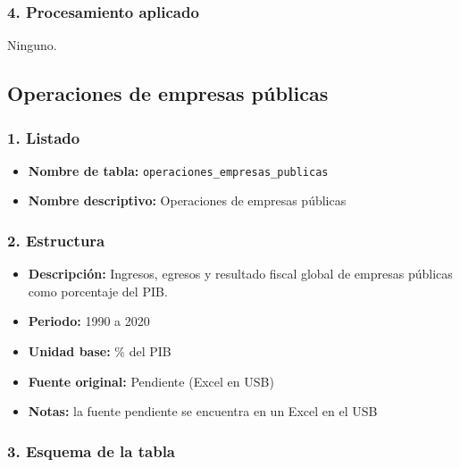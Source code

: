 \documentclass[12pt,a4paper]{article}
\begin{document}
\subsubsection*{4. Procesamiento aplicado}
Ninguno.

\subsection{Operaciones de empresas públicas}

\subsubsection*{1. Listado}
\begin{itemize}
  \item \textbf{Nombre de tabla:} \texttt{operaciones\_empresas\_publicas}
  \item \textbf{Nombre descriptivo:} Operaciones de empresas públicas
\end{itemize}

\subsubsection*{2. Estructura}
\begin{itemize}
  \item \textbf{Descripción:} Ingresos, egresos y resultado fiscal global de empresas públicas como porcentaje del PIB.
  \item \textbf{Periodo:} 1990 a 2020
  \item \textbf{Unidad base:} \% del PIB
  \item \textbf{Fuente original:} Pendiente (Excel en USB)
  \item \textbf{Notas:} la fuente pendiente se encuentra en un Excel en el USB
\end{itemize}

\subsubsection*{3. Esquema de la tabla}
\end{document}

